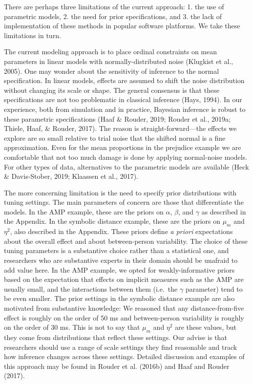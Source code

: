 \documentclass[english,,man]{apa6}
\begin{document}
There are perhaps three limitations of the current approach: 1. the use of parametric models, 2. the need for prior specifications, and 3. the lack of implementation of these methods in popular software platforms. We take these limitations in turn.

The current modeling approach is to place ordinal constraints on mean parameters in linear models with normally-distributed noise (Klugkist et al., 2005). One may wonder about the sensitivity of inference to the normal specification. In linear models, effects are assumed to shift the noise distribution without changing its scale or shape. The general consensus is that these specifications are not too problematic in classical inference (Hays, 1994). In our experience, both from simulation and in practice, Bayesian inference is robust to these parametric specifications (Haaf \& Rouder, 2019; Rouder et al., 2019a; Thiele, Haaf, \& Rouder, 2017). The reason is straight-forward---the effects we explore are so small relative to trial noise that the shifted normal is a fine approximation. Even for the mean proportions in the prejudice example we are comfortable that not too much damage is done by applying normal-noise models. For other types of data, alternatives to the parametric models are available (Heck \& Davis-Stober, 2019; Klaassen et al., 2017).

The more concerning limitation is the need to specify prior distributions with tuning settings. The main parameters of concern are those that differentiate the models. In the AMP example, these are the priors on \(\alpha\), \(\beta\), and \(\gamma\) as described in the Appendix. In the symbolic distance example, these are the priors on \(\mu_m\) and \(\eta^2\), also described in the Appendix. These priors define \emph{a priori} expectations about the overall effect and about between-person variability. The choice of these tuning parameters is a substantive choice rather than a statistical one, and researchers who are substantive experts in their domain should be unafraid to add value here. In the AMP example, we opted for weakly-informative priors based on the expectation that effects on implicit measures such as the AMP are usually small, and the interactions between them (i.e.~the \(\gamma\) parameter) tend to be even smaller. The prior settings in the symbolic distance example are also motivated from substantive knowledge: We reasoned that any distance-from-five effect is roughly on the order of 50 ms and between-person variability is roughly on the order of 30 ms. This is not to say that \(\mu_m\) and \(\eta^2\) are these values, but they come from distributions that reflect these settings. Our advise is that researchers should use a range of scale settings they find reasonable and track how inference changes across these settings. Detailed discussion and examples of this approach may be found in Rouder et al. (2016b) and Haaf and Rouder (2017).
\end{document}
